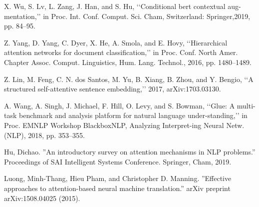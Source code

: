 \documentclass[conference]{IEEEtran}
\begin{document}
\begin{thebibliography}{00}
 X. Wu, S. Lv, L. Zang, J. Han, and S. Hu, ‘‘Conditional bert contextual aug-mentation,’’ in Proc. Int. Conf. Comput. Sci. Cham, Switzerland: Springer,2019, pp. 84–95.

 Z. Yang, D. Yang, C. Dyer, X. He, A. Smola, and E. Hovy, ‘‘Hierarchical attention networks for document classification,’’ in Proc. Conf. North Amer. Chapter Assoc. Comput. Linguistics, Hum. Lang. Technol., 2016, pp. 1480–1489.

 Z. Lin, M. Feng, C. N. dos Santos, M. Yu, B. Xiang, B. Zhou, and Y. Bengio, ‘‘A structured self-attentive sentence embedding,’’ 2017, arXiv:1703.03130.

 A. Wang, A. Singh, J. Michael, F. Hill, O. Levy, and S. Bowman, ‘‘Glue: A multi-task benchmark and analysis platform for natural language under-standing,’’ in Proc. EMNLP Workshop BlackboxNLP, Analyzing Interpret-ing Neural Netw. (NLP), 2018, pp. 353–355.

 Hu, Dichao. ”An introductory survey on attention mechanisms in NLP problems.” Proceedings of SAI Intelligent Systems Conference. Springer, Cham, 2019.

 Luong, Minh-Thang, Hieu Pham, and Christopher D. Manning. ”Effective approaches to attention-based neural machine translation.” arXiv preprint arXiv:1508.04025 (2015).
\end{thebibliography}
\vspace{12pt}
\color{red}
\end{document}
